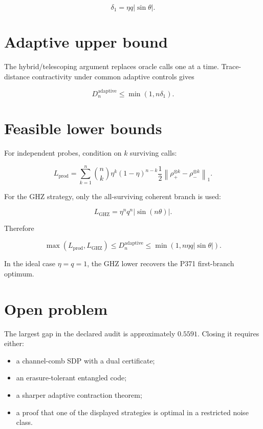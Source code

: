 \documentclass[11pt,a4paper,openany]{report}
\begin{document}
\[
\delta_1=\eta q|\sin\theta|.
\]

\section{Adaptive upper bound}

The hybrid/\allowbreak{}telescoping argument replaces oracle calls one at a time. Trace-distance contractivity under common adaptive controls gives

\[
D_n^{\mathrm{adaptive}}
\leq
\min(1,n\delta_1).
\]

\section{Feasible lower bounds}

For independent probes, condition on \(k\) surviving calls:

\[
L_{\mathrm{prod}}
=
\sum_{k=1}^n
\binom nk\eta^k(1-\eta)^{n-k}
\frac12
\left\|
\rho_+^{\otimes k}
-
\rho_-^{\otimes k}
\right\|_1.
\]

For the GHZ strategy, only the all-surviving coherent branch is used:

\[
L_{\mathrm{GHZ}}
=
\eta^nq^n|\sin(n\theta)|.
\]

Therefore

\[
\max(L_{\mathrm{prod}},L_{\mathrm{GHZ}})
\leq
D_n^{\mathrm{adaptive}}
\leq
\min(1,n\eta q|\sin\theta|).
\]

In the ideal case \(\eta=q=1\), the GHZ lower recovers the P371 first-branch optimum.

\section{Open problem}

The largest gap in the declared audit is approximately \(0.5591\). Closing it requires either:

\begin{itemize}
\item 
a channel-comb SDP with a dual certificate;

\item 
an erasure-tolerant entangled code;

\item 
a sharper adaptive contraction theorem;

\item 
a proof that one of the displayed strategies is optimal in a restricted noise class.

\end{itemize}
\end{document}
